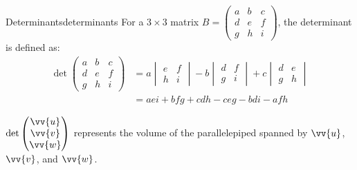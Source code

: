 \begin{definition}{Determinants}{determinants}
For a $3 \times 3$ matrix $B = \begin{pmatrix} a & b & c \\ d & e & f \\ g & h & i \end{pmatrix}$, the determinant is defined as:
\begin{align*}
\det \begin{pmatrix} a & b & c \\ d & e & f \\ g & h & i \end{pmatrix} &= a\begin{vmatrix} e & f \\ h & i \end{vmatrix} - b\begin{vmatrix} d & f \\ g & i \end{vmatrix} + c\begin{vmatrix} d & e \\ g & h \end{vmatrix} \\
                                                                       &= aei + bfg + cdh - ceg - bdi - afh
\end{align*}

$\det \begin{pmatrix} \vv{u} \\ \vv{v} \\ \vv{w} \end{pmatrix}$ represents the volume of the parallelepiped spanned by $\vv{u}$, $\vv{v}$, and $\vv{w}$.

\begin{center}
\end{center}
\end{definition}
